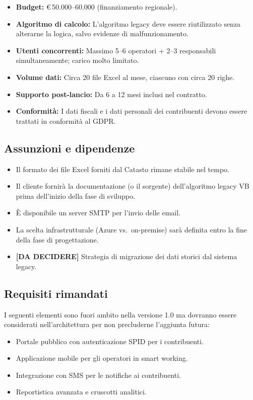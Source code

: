\documentclass[12pt, a4paper]{article}
\begin{document}
\begin{itemize}
  \item \textbf{Budget:} €\,50.000--60.000 (finanziamento regionale).
  \item \textbf{Algoritmo di calcolo:} L'algoritmo legacy deve essere riutilizzato senza
        alterarne la logica, salvo evidenze di malfunzionamento.
  \item \textbf{Utenti concorrenti:} Massimo 5--6 operatori + 2--3 responsabili
        simultaneamente; carico molto limitato.
  \item \textbf{Volume dati:} Circa 20 file Excel al mese, ciascuno con circa 20 righe.
  \item \textbf{Supporto post-lancio:} Da 6 a 12 mesi inclusi nel contratto.
  \item \textbf{Conformità:} I dati fiscali e i dati personali dei contribuenti devono essere
        trattati in conformità al GDPR.
\end{itemize}

\subsection{Assunzioni e dipendenze}

\begin{itemize}
  \item Il formato dei file Excel forniti dal Catasto rimane stabile nel tempo.
  \item Il cliente fornirà la documentazione (o il sorgente) dell'algoritmo legacy VB
        prima dell'inizio della fase di sviluppo.
  \item È disponibile un server SMTP per l'invio delle email.
  \item La scelta infrastrutturale (Azure vs.\ on-premise) sarà definita entro la fine
        della fase di progettazione.
  \item \textbf{[DA DECIDERE]} Strategia di migrazione dei dati storici dal sistema legacy.
\end{itemize}

\subsection{Requisiti rimandati}

I seguenti elementi sono fuori ambito nella versione 1.0 ma dovranno essere
considerati nell'architettura per non precluderne l'aggiunta futura:

\begin{itemize}
  \item Portale pubblico con autenticazione SPID per i contribuenti.
  \item Applicazione mobile per gli operatori in smart working.
  \item Integrazione con SMS per le notifiche ai contribuenti.
  \item Reportistica avanzata e cruscotti analitici.
\end{itemize}
\end{document}
